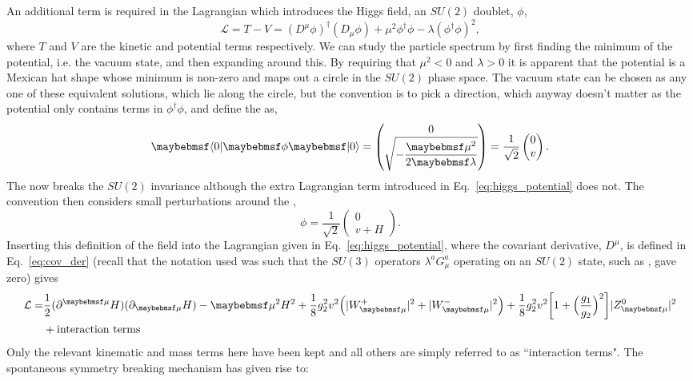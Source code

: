 An additional term is required in the \SM Lagrangian which introduces the Higgs field, an $SU(2)$ doublet, $\phi$,
\begin{equation}
  \mathcal{L} = T - V = (D^{\mu}\phi)^{\dagger}(D_{\mu}\phi) + \mu^{2}\phi^{\dagger}\phi - \lambda(\phi^{\dagger}\phi)^{2},
  \label{eq:higgs_potential}
\end{equation}
where $T$ and $V$ are the kinetic and potential terms respectively. We can study the particle spectrum by first finding the minimum of the potential, i.e. the vacuum state, and then expanding around this. By requiring that $\mu^{2}<0$ and $\lambda>0$ it is apparent that the potential is a Mexican hat shape whose minimum is non-zero and maps out a circle in the $SU(2)$ phase space. The vacuum state can be chosen as any one of these equivalent solutions, which lie along the circle, but the convention is to pick a direction, which anyway doesn't matter as the potential only contains terms in $\phi^{\dagger}\phi$, and define the \VEV as,
\begin{equation}
  \bra{0}\phi\ket{0} = \begin{pmatrix} 0 \\ \sqrt{-\dfrac{\mu^{2}}{2\lambda}} \end{pmatrix} = \frac{1}{\sqrt{2}} \begin{pmatrix} 0 \\ v \end{pmatrix}.
\end{equation}
The \VEV now breaks the $SU(2)$ invariance although the extra Lagrangian term introduced in Eq.~\ref{eq:higgs_potential} does not. The convention then considers small perturbations around the \VEV,
\begin{equation}
  \phi = \dfrac{1}{\sqrt{2}}\begin{pmatrix} 0 \\ v+H \end{pmatrix}.
\end{equation}
Inserting this definition of the field \phi into the Lagrangian given in Eq.~\ref{eq:higgs_potential}, where the covariant derivative, $D^{\mu}$, is defined in Eq.~\ref{eq:cov_der} (recall that the notation used was such that the $SU(3)$ operators $\lambda^{a}G^{a}_{\mu}$ operating on an $SU(2)$ state, such as \phi, gave zero) gives
\begin{align}
  \mathcal{L} = & \frac{1}{2}(\partial^{\mu}H)(\partial_{\mu}H) - \mu^{2}H^{2} + \frac{1}{8}g_{2}^{2}v^{2}\Bigl(|W_{\mu}^{+}|^{2}+|W_{\mu}^{-}|^{2}\Bigr) +\frac{1}{8}g_{2}^{2}v^{2}\biggl[1+\Bigl(\frac{g_{1}}{g_{2}}\Bigr)^{2}\biggr]|Z^{0}_{\mu}|^{2} \nonumber\\ 
  & + \mbox{interaction terms} 
\end{align}
Only the relevant kinematic and mass terms here have been kept and all others are simply referred to as ``interaction terms". The spontaneous symmetry breaking mechanism has given rise to:

